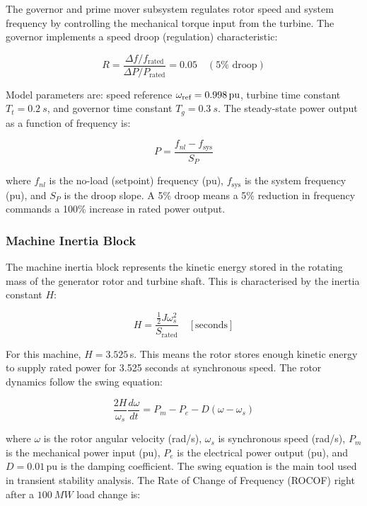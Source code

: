 The governor and prime mover subsystem regulates rotor speed and system
frequency by controlling the mechanical torque input from the turbine. The
governor implements a speed droop (regulation) characteristic:

\begin{equation}
  R = \frac{\Delta f / f_\text{rated}}{\Delta P / P_\text{rated}} = 0.05
  \quad (5\%\text{ droop})
  \label{eq:droop_def}
\end{equation}

Model parameters are: speed reference $\omega_\text{ref} = 0.998\,\text{pu}$,
turbine time constant $T_t = \SI{0.2}{s}$, and governor time constant
$T_g = \SI{0.3}{s}$. The steady-state power output as a function of
frequency is:

\begin{equation}
  P = \frac{f_{nl} - f_\text{sys}}{S_P}
  \label{eq:droop_power}
\end{equation}

\noindent where $f_{nl}$ is the no-load (setpoint) frequency (pu), $f_\text{sys}$
is the system frequency (pu), and $S_P$ is the droop slope. A 5\% droop means
a 5\% reduction in frequency commands a 100\% increase in rated power output.

\subsubsection{Machine Inertia Block}

The machine inertia block represents the kinetic energy stored in the rotating
mass of the generator rotor and turbine shaft. This is characterised by the
inertia constant $H$:

\begin{equation}
  H = \frac{\tfrac{1}{2}J\omega_s^2}{S_\text{rated}}
  \quad [\text{seconds}]
  \label{eq:inertia_constant}
\end{equation}

\noindent For this machine, $H = 3.525$\,s. This means the rotor stores enough
kinetic energy to supply rated power for 3.525 seconds at synchronous speed.
The rotor dynamics follow the swing equation:

\begin{equation}
  \frac{2H}{\omega_s}\frac{d\omega}{dt} = P_m - P_e - D(\omega - \omega_s)
  \label{eq:swing}
\end{equation}

\noindent where $\omega$ is the rotor angular velocity (rad/s), $\omega_s$ is
synchronous speed (rad/s), $P_m$ is the mechanical power input (pu), $P_e$ is
the electrical power output (pu), and $D = 0.01$\,pu is the damping
coefficient. The swing equation is the main tool used in transient stability
analysis. The Rate of Change of Frequency (ROCOF) right after a
$\SI{100}{MW}$ load change is:

